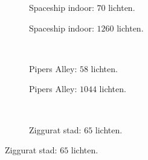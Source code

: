 \begin{figure}[t]
  \begin{adjustbox}{minipage=\textwidth, scale=0.55}
    \begin{subfigure}[b]{0.8\textwidth}
      \centering
      \def\svgwidth{\textwidth}
      
      \caption{Spaceship indoor: $70$ lichten.}
      \label{fig:hs-seed-exec:indoor-low}
    \end{subfigure}
  \end{adjustbox}\hspace{-0.075\textwidth}  %
  \begin{adjustbox}{minipage=\textwidth, scale=0.55}
    \begin{subfigure}[b]{0.8\textwidth}
      \centering
      \def\svgwidth{\textwidth}
      
      \caption{Spaceship indoor: $1260$ lichten.}
      \label{fig:hs-seed-exec:indoor-high}
    \end{subfigure}
  \end{adjustbox} \\
  \begin{adjustbox}{minipage=\textwidth, scale=0.55}
    \begin{subfigure}[b]{0.8\textwidth}
      \centering
      \def\svgwidth{\textwidth}
      
      \caption{Pipers Alley: $58$ lichten.}
      \label{fig:hs-seed-exec:alley-low}
    \end{subfigure}
  \end{adjustbox}\hspace{-0.075\textwidth}  %
  \begin{adjustbox}{minipage=\textwidth, scale=0.55}
    \begin{subfigure}[b]{0.8\textwidth}
      \centering
      \def\svgwidth{\textwidth}
      
      \caption{Pipers Alley: $1044$ lichten.}
      \label{fig:hs-seed-exec:alley-high}
    \end{subfigure}
  \end{adjustbox} \\
  \begin{adjustbox}{minipage=\textwidth, scale=0.55}
    \begin{subfigure}[b]{0.8\textwidth}
      \centering
      \def\svgwidth{\textwidth}
      
      \caption{Ziggurat stad: $65$ lichten.}

\end{subfigure}
\end{adjustbox}
\end{figure}
